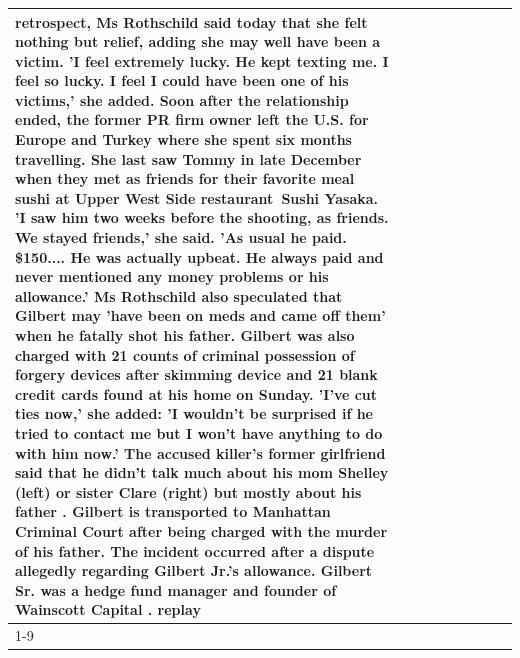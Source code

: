 \begin{table}[H]
\begin{tabular}{lllrlllll}
retrospect, Ms Rothschild said today that she felt nothing but relief, adding she may well have been a victim. 'I feel extremely lucky. He kept texting me. I feel so lucky. I feel I could have been one of his victims,' she added. Soon after the relationship ended, the former PR firm owner left the U.S. for Europe and Turkey where she spent six months  travelling. She last saw Tommy in late December when they met as friends for their favorite meal sushi at Upper West Side restaurant Sushi Yasaka. 'I saw him two weeks before the shooting, as friends. We stayed friends,' she said. 'As usual he paid. \$150.... He was actually upbeat. He always paid and never mentioned any money problems or his allowance.' Ms Rothschild also speculated that Gilbert may 'have been on meds and came off them' when he fatally shot his father. Gilbert was also charged with 21 counts of criminal possession of forgery devices after skimming device and 21 blank credit cards found at his home on Sunday. 'I've cut ties now,' she added: 'I wouldn’t be surprised if he tried to contact me but I won’t have anything to do with him now.' The accused killer's former girlfriend said that he didn't talk much about his mom Shelley (left) or sister Clare (right) but mostly about his father . Gilbert is transported to Manhattan Criminal Court  after being charged with the murder of his father. The incident occurred after a dispute allegedly regarding Gilbert Jr.'s allowance. Gilbert Sr. was a hedge fund manager and founder of Wainscott Capital . replay \\
\cline{1-9}

\end{tabular}
\end{table}
